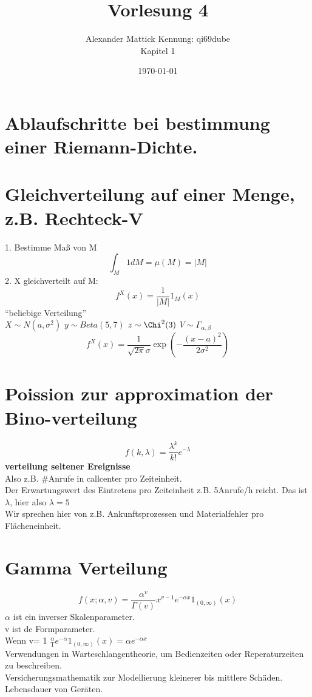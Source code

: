 \documentclass{article}
\author{
Alexander Mattick Kennung: qi69dube\\
Kapitel 1
}
\date{\today}
\title{Vorlesung 4}
\begin{document}
	\maketitle
	\section{Ablaufschritte bei bestimmung einer Riemann-Dichte.}
	\section{Gleichverteilung auf einer Menge, z.B. Rechteck-V}
	1. Bestimme Maß von M
	\[\int_M 1dM=\mu(M)=|M|\]
	2. X gleichverteilt auf M:
	\[f^X(x) = \frac{1}{|M|}1_M(x)\]
	``beliebige Verteilung''\\
	$X\sim N(a,\sigma^2)$ $y\sim Beta(5,7)$ $z\sim \Chi^2(3)$ $V\sim \Gamma_{\alpha,\beta}$\\
	\[f^X(x)=\frac{1}{\sqrt{2\pi}\sigma}\exp(-\frac{(x-a)^2}{2\sigma^2})\]
	\section{Poission zur approximation der Bino-verteilung}
	\[f(k,\lambda) = \frac{\lambda^k}{k!} e^{-\lambda}\]
	\textbf{verteilung seltener Ereignisse}\\
	Also z.B. #Anrufe in callcenter pro Zeiteinheit.\\
	Der Erwartungswert des Eintretens pro Zeiteinheit z.B. 5Anrufe/h reicht. Das ist $\lambda$, hier also $\lambda = 5$\\
	Wir sprechen hier von z.B. Ankunftsprozessen und Materialfehler pro Flächeneinheit.\\
	\section{Gamma Verteilung}
	\[f(x;\alpha,v) =\frac{\alpha^v}{\Gamma(v)}x^{v-1} e^{-\alpha x} 1_{(0,\infty)} (x)\]
	$\alpha$ ist ein inverser Skalenparameter.\\
	v ist de Formparameter.\\
	Wenn v= 1 $\frac{\alpha}{1} e^{-\alpha} 1_{(0,\infty)} (x) = \alpha e^{-\alpha x}$\\
	Verwendungen in Warteschlangentheorie, um Bedienzeiten oder Reperaturzeiten zu beschreiben.\\
	Versicherungsmathematik zur Modellierung kleinerer bis mittlere Schäden.\\
	Lebensdauer von Geräten.\\
\end{document}

